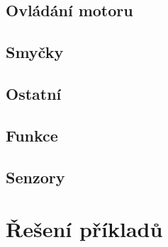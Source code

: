 \subsection{Ovládání motoru }
\begin{itemize}
	\blockMotorStart
	\blockMotorStop
	\blockMotorDistance
	\blockMotorVelocity
\end{itemize}

\subsection{Smyčky }
\begin{itemize}
	\blockLoop
	\blockLoopForever
	\blockLoopWhile
\end{itemize}

\subsection{Ostatní }
\begin{itemize}
	\blockStart
	\blockMotorDone
	\blockWait
	\blockWaitUntil
\end{itemize}

\subsection{Funkce }
\begin{itemize}
	\blockFunctionDefinition
	\blockFunctionCall
\end{itemize}

\subsection{Senzory }
\begin{itemize}
	\blockBumperPressed
\end{itemize}

\newpage

\section{Řešení příkladů}\label{cha:sol}

\printsolutions

\newpage

\nocite{*}
\printbibliography[title={Zdroje a odkazy}]

